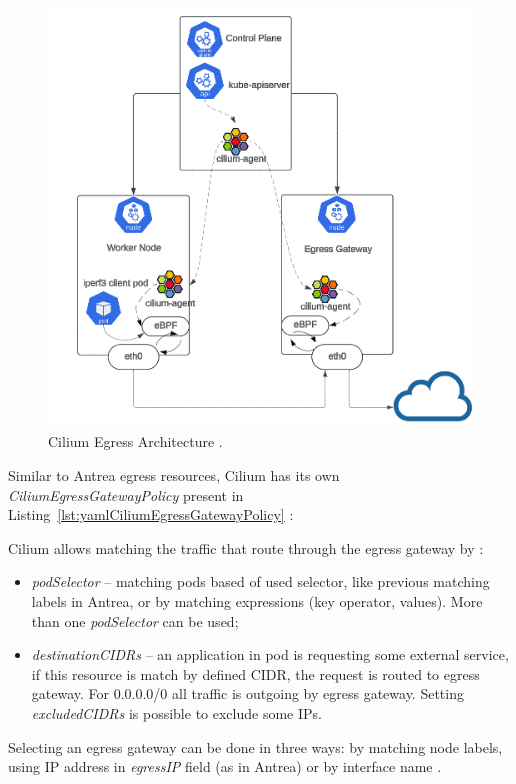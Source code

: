 \begin{figure}[tbh]
    \centering
    \includegraphics[width=0.9\columnwidth]{images/cilium_egress.png}
    \caption{Cilium Egress Architecture \cite{CiliumUseCases}.}
    \label{fig:ciliumEgressArch}
\end{figure}

Similar to Antrea egress resources, Cilium has its own \textit{CiliumEgressGatewayPolicy} present in Listing~\ref{lst:yamlCiliumEgressGatewayPolicy} \cite{CiliumDocs}:

Cilium allows matching the traffic that route through the egress gateway by \cite{CiliumDocs}:
\begin{itemize}
    \item \textit{podSelector} -- matching pods based of used selector, like previous matching labels in Antrea, or by matching expressions (key operator, values). More than one \textit{podSelector} can be used;
    \item \textit{destinationCIDRs} -- an application in pod is requesting some external service, if this resource is match by defined CIDR, the request is routed to egress gateway. For 0.0.0.0/0 all traffic is outgoing by egress gateway. Setting \textit{excludedCIDRs} is possible to exclude some IPs.
\end{itemize}

Selecting an egress gateway can be done in three ways: by matching node labels, using IP address in \textit{egressIP} field (as in Antrea) or by interface name \cite{CiliumDocs}. 

